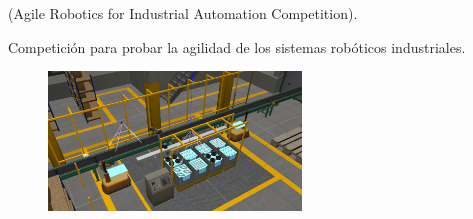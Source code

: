 \documentclass[notes,slidesec,a4]{seminar}
\begin{document}
\begin{hslide}
		\begin{center}(Agile Robotics for Industrial Automation Competition).	\end{center}
		Competición para probar la agilidad de los sistemas robóticos industriales.
	\begin{center}
		\begin{figure}
			\includegraphics[width=0.6\textwidth]{ariac01.png}
		\end{figure}
	\end{center}
	
\end{hslide}
\end{document}

